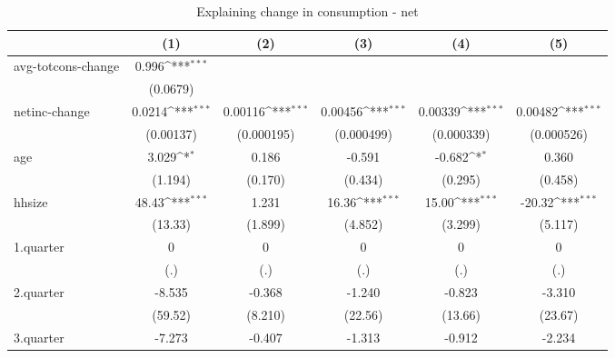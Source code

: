 \begin{table}[htbp]\centering
\def\sym#1{\ifmmode^{#1}\else\(^{#1}\)\fi}
\caption{\label{tab:2.1B-deltacons-net} Explaining change in consumption - net}
\begin{tabular}{l*{5}{c}}
\hline\hline
            &\multicolumn{1}{c}{(1)}         &\multicolumn{1}{c}{(2)}         &\multicolumn{1}{c}{(3)}         &\multicolumn{1}{c}{(4)}         &\multicolumn{1}{c}{(5)}         \\
\hline
avg-totcons-change&       0.996\sym{***}&                     &                     &                     &                     \\
            &    (0.0679)         &                     &                     &                     &                     \\
netinc-change&      0.0214\sym{***}&     0.00116\sym{***}&     0.00456\sym{***}&     0.00339\sym{***}&     0.00482\sym{***}\\
            &   (0.00137)         &  (0.000195)         &  (0.000499)         &  (0.000339)         &  (0.000526)         \\
age         &       3.029\sym{*}  &       0.186         &      -0.591         &      -0.682\sym{*}  &       0.360         \\
            &     (1.194)         &     (0.170)         &     (0.434)         &     (0.295)         &     (0.458)         \\
hhsize      &       48.43\sym{***}&       1.231         &       16.36\sym{***}&       15.00\sym{***}&      -20.32\sym{***}\\
            &     (13.33)         &     (1.899)         &     (4.852)         &     (3.299)         &     (5.117)         \\
1.quarter   &           0         &           0         &           0         &           0         &           0         \\
            &         (.)         &         (.)         &         (.)         &         (.)         &         (.)         \\
2.quarter   &      -8.535         &      -0.368         &      -1.240         &      -0.823         &      -3.310         \\
            &     (59.52)         &     (8.210)         &     (22.56)         &     (13.66)         &     (23.67)         \\
3.quarter   &      -7.273         &      -0.407         &      -1.313         &      -0.912         &      -2.234         \\

\end{tabular}
\end{table}
